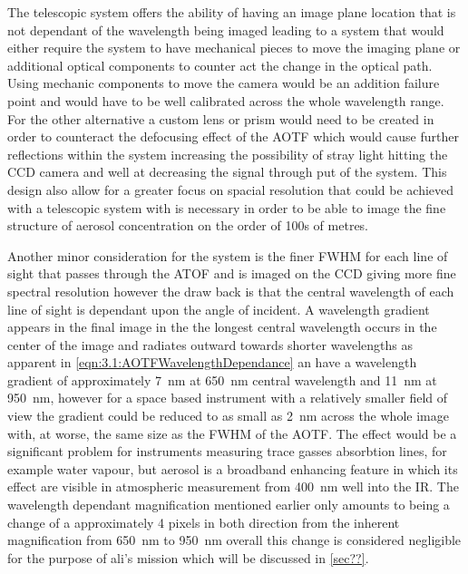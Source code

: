 \documentclass[12pt]{article}
\begin{document}
The telescopic system offers the ability of having an image plane location that is not dependant of the wavelength being imaged leading to a system that would either require the system to have mechanical pieces to move the imaging plane or additional optical components to counter act the change in the optical path. Using mechanic components to move the camera would be an addition failure point and would have to be well calibrated across the whole wavelength range. For the other alternative a custom lens or prism would need to be created in order to counteract the defocusing effect of the AOTF which would cause further reflections within the system increasing the possibility of stray light hitting the CCD camera and well at decreasing the signal through put of the system. This design also allow for a greater focus on spacial resolution that could be achieved with a telescopic system with is necessary in order to be able to image the fine structure of aerosol concentration on the order of 100s of metres.

Another minor consideration for the system is the finer FWHM for each line of sight that passes through the ATOF and is imaged on the CCD giving more fine spectral resolution however the draw back is that the central wavelength of each line of sight is dependant upon the angle of incident. A wavelength gradient appears in the final image in the the longest central wavelength occurs in the center of the image and radiates outward towards shorter wavelengths as apparent in \autoref{eqn:3.1:AOTFWavelengthDependance} an have a wavelength gradient of approximately 7~nm at 650~nm central wavelength and 11~nm at 950~nm, however for a space based instrument with a relatively smaller field of view the gradient could be reduced to as small as 2~nm across the whole image with, at worse, the same size as the FWHM of the AOTF. The effect would be a significant problem for instruments measuring trace gasses absorbtion lines, for example water vapour, but aerosol is a broadband enhancing feature in which its effect are visible in atmospheric measurement from 400~nm well into the IR. The wavelength dependant magnification mentioned earlier only amounts to being a change of a approximately 4 pixels in both direction from the inherent magnification from 650~nm to 950~nm overall this change is considered negligible for the purpose of ali's mission which will be discussed in \autoref{sec??}.
\end{document}
